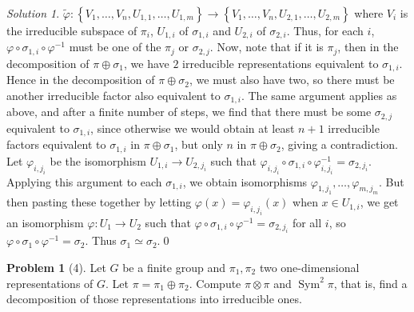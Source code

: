 \documentclass[reqno]{amsart}
\theoremstyle{definition}
\newtheorem{problem}[theorem]{Problem}
\theoremstyle{remark}
\newtheorem*{solution}{Solution}
\DeclareMathOperator{\Sym}{Sym}
\begin{document}
\begin{solution}
        $\tilde{\varphi } \colon 
        \left\{ V_1, \ldots, V_n, U_{1,1}, \ldots,
        U_{1,m} \right\} \to 
        \left\{ V_1, \ldots, V_n, 
        U_{2,1}, \ldots, U_{2,m}\right\} $ where
        $V_i$ is the irreducible subspace of
        $\pi_i$, $U_{1,i}$ of $\sigma_{1,i}$ and
        $U_{2,i}$ of $\sigma_{2,i}$.
        Thus, for each $i$,
        $\varphi \circ \sigma_{1,i} \circ \varphi^{-1}$ must
        be one of the 
        $\pi_j$ or $\sigma_{2,j}$. Now, note that
        if it is  $\pi_j$, then in the decomposition of
        $\pi \oplus \sigma_1$, we have
        $2$ irreducible representations equivalent to
        $\sigma_{1,i}$. Hence in the decomposition of
        $\pi \oplus \sigma_2$, we must also have two, so
        there must be another irreducible factor also
        equivalent to $\sigma_{1,i}$. The same argument applies as
        above, and after a finite number of steps, we find
        that there must be some
        $\sigma_{2,j}$ equivalent to
        $\sigma_{1,i}$, since otherwise we would obtain
        at least $n+1$ irreducible factors equivalent to
        $\sigma_{1,i}$ in $\pi \oplus \sigma_{1}$, but only
        $n$ in $\pi \oplus \sigma_2$, giving a contradiction.
        Let $\varphi_{i,j_{i}}$ be the isomorphism
        $U_{1,i} \to U_{2,j_{i}}$ such that
        $\varphi_{i,j_{i}} \circ \sigma_{1,i} \circ
        \varphi_{i,j_{i}}^{-1} = \sigma_{2,j_{i}}$.
        Applying this argument to each
        $\sigma_{1,i}$, we obtain isomorphisms
        $ \varphi_{1,j_{1}},
        \ldots, \varphi_{m,j_{m}}$. But then
        pasting these together
        by letting 
        $ \varphi (x) = \varphi_{i,j_{i}}(x)$ when
        $x \in U_{1,i}$, we get an isomorphism
        $\varphi \colon U_1 \to U_2$ such that
        $\varphi \circ \sigma_{1,i} \circ \varphi^{-1}
        = \sigma_{2, j_{i}}$ for all $i$, so
        $\varphi \circ \sigma_1 \circ \varphi^{-1}
        = \sigma_2$. Thus
        $\sigma_1 \simeq \sigma_2$.\qed



        





    \end{solution}


    \begin{problem}[4]
        Let $G$ be a finite group and $\pi_1, \pi_2$ two
        one-dimensional representations of $G$. Let
        $\pi = \pi_1 \oplus \pi_2$. Compute
        $\pi \otimes \pi$ and $\Sym^2 \pi$, that is,
        find a decomposition of those representations
        into irreducible ones.
    \end{problem}
\end{document}
